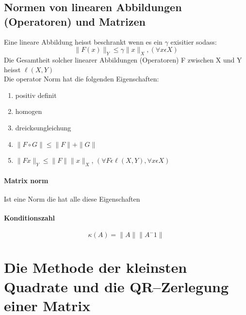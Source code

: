 \documentclass[11pt]{article}
\begin{document}
\subsection{Normen von linearen Abbildungen (Operatoren) und Matrizen}
Eine lineare Abbildung heisst beschrankt wenn es ein $\gamma$ exisitier sodass:
\begin{equation}
	\parallel F(x)\parallel_Y \leq \gamma\parallel x\parallel_X, (\forall x \epsilon X)
\end{equation}
Die Gesamtheit solcher linearer Abbildungen (Operatoren) F zwischen X und Y heisst $\ell (X,Y)$\\
Die operator Norm hat die folgenden Eigenschaften:
\begin{enumerate}
	\item positiv definit
	\item homogen
	\item dreicksungleichung
	\item $\parallel F\circ G\parallel \leq \parallel F\parallel + \parallel G \parallel$
	\item $\parallel Fx\parallel_Y \leq \parallel F\parallel \parallel x\parallel_X$,  $(\forall F \epsilon \ell(X,Y), \forall x \epsilon X)$  
\end{enumerate}
\paragraph{Matrix norm}
Ist eine Norm die hat alle diese Eigenschaften
\paragraph{Konditionszahl}
\begin{equation}
	\kappa(A) = \parallel A\parallel \parallel A^-1\parallel
\end{equation}
\section{Die Methode der kleinsten Quadrate und die QR–Zerlegung einer Matrix}
\end{document}
